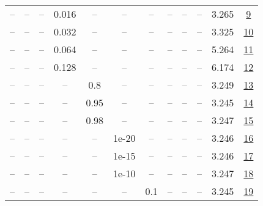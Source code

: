 \begin{table}[H]
\begin{tabular}{cccccccccccc}
-- & -- & -- & 0.016 & -- & -- & -- & -- & -- & -- & 3.265 & \href{https://wandb.ai/stanford-mercury/optimizer-scaling/runs/sweep-130m-21B-sciona69758lr0.016-wd0.1-minlr0-warmup0-b10.98-gn-84229e}{9} \\
-- & -- & -- & 0.032 & -- & -- & -- & -- & -- & -- & 3.325 & \href{https://wandb.ai/stanford-mercury/optimizer-scaling/runs/sweep-130m-21B-scion48e30elr0.032-wd0.1-minlr0-warmup0-b10.98-gn-b8cecb}{10} \\
-- & -- & -- & 0.064 & -- & -- & -- & -- & -- & -- & 5.264 & \href{https://wandb.ai/stanford-mercury/optimizer-scaling/runs/sweep-130m-21B-scion32f5fdlr0.064-wd0.1-minlr0-warmup0-b10.98-gn-4e855e}{11} \\
-- & -- & -- & 0.128 & -- & -- & -- & -- & -- & -- & 6.174 & \href{https://wandb.ai/stanford-mercury/optimizer-scaling/runs/sweep-130m-21B-scion14cd60lr0.128-wd0.1-minlr0-warmup0-b10.98-gn-100c56}{12} \\
-- & -- & -- & -- & 0.8 & -- & -- & -- & -- & -- & 3.249 & \href{https://wandb.ai/stanford-mercury/optimizer-scaling/runs/sweep-130m-21B-sciontc26c48lr0.008-wd0.1-minlr0-warmup0-b10.98-g-7baa87}{13} \\
-- & -- & -- & -- & 0.95 & -- & -- & -- & -- & -- & 3.245 & \href{https://wandb.ai/stanford-mercury/optimizer-scaling/runs/sweep-130m-21B-sciono046318lr0.008-wd0.1-minlr0-warmup0-b10.98-g-682eb4}{14} \\
-- & -- & -- & -- & 0.98 & -- & -- & -- & -- & -- & 3.247 & \href{https://wandb.ai/stanford-mercury/optimizer-scaling/runs/sweep-130m-21B-sciono44ab05lr0.008-wd0.1-minlr0-warmup0-b10.98-g-665c33}{15} \\
-- & -- & -- & -- & -- & 1e-20 & -- & -- & -- & -- & 3.246 & \href{https://wandb.ai/stanford-mercury/optimizer-scaling/runs/sweep-130m-21B-scionecd5b4lr0.008-wd0.1-minlr0-warmup0-b10.98-gn-92c4e5}{16} \\
-- & -- & -- & -- & -- & 1e-15 & -- & -- & -- & -- & 3.246 & \href{https://wandb.ai/stanford-mercury/optimizer-scaling/runs/sweep-130m-21B-scionk08138alr0.008-wd0.1-minlr0-warmup0-b10.98-g-278e54}{17} \\
-- & -- & -- & -- & -- & 1e-10 & -- & -- & -- & -- & 3.247 & \href{https://wandb.ai/stanford-mercury/optimizer-scaling/runs/sweep-130m-21B-scion5d7828lr0.008-wd0.1-minlr0-warmup0-b10.98-gn-94d764}{18} \\
-- & -- & -- & -- & -- & -- & 0.1 & -- & -- & -- & 3.245 & \href{https://wandb.ai/stanford-mercury/optimizer-scaling/runs/sweep-130m-21B-scionpc9b6c6lr0.008-wd0.1-minlr0-warmup0-b10.98-g-847bd4}{19} \\

\end{tabular}
\end{table}
